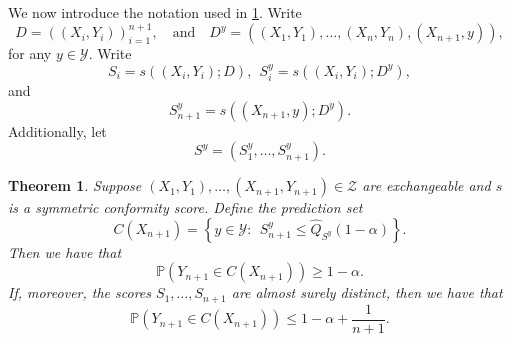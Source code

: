 \documentclass[11pt, titlepage]{article} %
\newcommand{\Prob}[1]{\mathbb{P}\left( #1 \right)}
\numberwithin{equation}{section}
\newtheorem{theorem}{Theorem}
\theoremstyle{definition}
\numberwithin{theorem}{section}
\numberwithin{lemma}{section}
\numberwithin{corollary}{section}
\numberwithin{proposition}{section}
\numberwithin{definition}{section}
\numberwithin{remark}{section}
\begin{document}
\noindent
We now introduce the notation used in \cref{thm:fullconformal_coverage}. Write \[D = ((X_i, Y_i))_{i=1}^{n+1}, \quad \text{and} \quad D^{y} = ((X_1, Y_1), \ldots, (X_n, Y_n), (X_{n+1}, y)), \] for any \(y \in \mathcal{Y}\).  Write \[S_i = s((X_i, Y_i); D), \ \ S_i^y = s((X_i, Y_i); D^y), \] and \[S_{n+1}^y = s((X_{n+1}, y); D^y).\] Additionally, let \[S^y = (S_1^y, \ldots, S_{n+1}^y).\]

\begin{theorem}
    Suppose \((X_1, Y_1), \ldots, (X_{n+1}, Y_{n+1}) \in \mathcal{Z}\) are exchangeable and \(s\) is a symmetric conformity score. Define the prediction set \begin{equation}
        C(X_{n+1}) = \left\{ y \in \mathcal{Y}: \ \ S_{n+1}^y \leq \hat{Q}_{S^y}(1-\alpha) \right\}.
    \label{eqn:fullconformal_prediction_set}
    \end{equation} Then we have that \[\Prob{Y_{n+1} \in C(X_{n+1})} \geq 1-\alpha.\] If, moreover, the scores \(S_1, \ldots, S_{n+1}\) are almost surely distinct, then we have that \[\Prob{Y_{n+1} \in C(X_{n+1})} \leq 1-\alpha + \frac{1}{n+1}.\]

\label{thm:fullconformal_coverage}  
\end{theorem}
\end{document}
